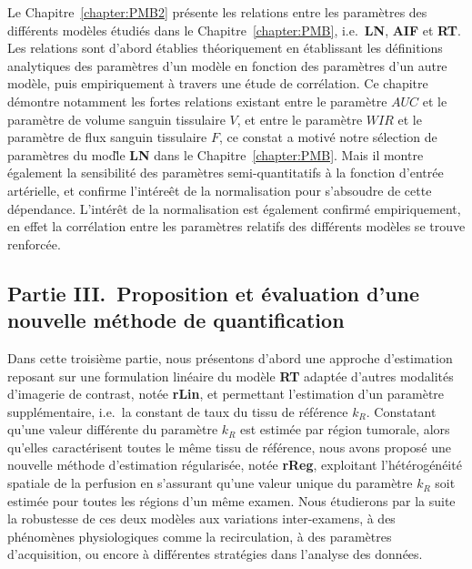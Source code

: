 \begin{otherlanguage}{francais}
Le Chapitre~\ref{chapter:PMB2} pr\'esente les relations entre les param\`etres des diff\'erents mod\`eles \'etudi\'es dans le Chapitre~\ref{chapter:PMB}, i.e.~\textbf{LN}, \textbf{AIF} et \textbf{RT}.
Les relations sont d'abord \'etablies th\'eoriquement en \'etablissant les d\'efinitions analytiques des param\`etres d'un mod\`ele en fonction des param\`etres d'un autre mod\`ele, puis empiriquement \`a travers une \'etude de corr\'elation.
Ce chapitre d\'emontre notamment les fortes relations existant entre le param\`etre $AUC$ et le param\`etre de volume sanguin tissulaire $V$, et entre le param\`etre $WIR$ et le param\`etre de flux sanguin tissulaire $F$, ce constat a motiv\'e notre s\'election de param\`etres du mod\`le \textbf{LN} dans le Chapitre~\ref{chapter:PMB}. 
Mais il montre \'egalement la sensibilit\'e des param\`etres semi-quantitatifs \`a la fonction d'entr\'ee art\'erielle, et confirme l'int\'ere\^et de la normalisation pour s'absoudre de cette d\'ependance.
L'int\'er\^et de la normalisation est \'egalement confirm\'e empiriquement, en effet la corr\'elation entre les param\`etres relatifs des diff\'erents mod\`eles se trouve renforc\'ee.

\subsection*{Partie III.~Proposition et \'evaluation d'une nouvelle m\'ethode de quantification}
Dans cette troisi\`eme partie, nous pr\'esentons d'abord une approche d'estimation reposant sur une formulation lin\'eaire du mod\`ele \textbf{RT} adapt\'ee d'autres modalit\'es d'imagerie de contrast, not\'ee \textbf{rLin}, et permettant l'estimation d'un param\`etre suppl\'ementaire, i.e.~la constant de taux du tissu de r\'ef\'erence $k_R$.
Constatant qu'une valeur diff\'erente du param\`etre $k_R$ est estim\'ee par r\'egion tumorale, alors qu'elles caract\'erisent toutes le m\^eme tissu de r\'ef\'erence, nous avons propos\'e une nouvelle m\'ethode d'estimation r\'egularis\'ee, not\'ee \textbf{rReg}, exploitant l'h\'et\'erog\'en\'eit\'e spatiale de la perfusion en s'assurant qu'une valeur unique du param\`etre $k_R$ soit estim\'ee pour toutes les r\'egions d'un m\^eme examen.
Nous \'etudierons par la suite la robustesse de ces deux mod\`eles aux variations inter-examens, \`a des ph\'enom\`enes physiologiques comme la recirculation, \`a des param\`etres d'acquisition, ou encore \`a diff\'erentes strat\'egies dans l'analyse des donn\'ees.


\end{otherlanguage}
